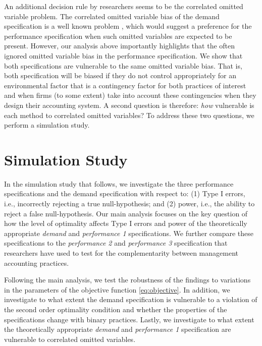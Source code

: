 \documentclass[12pt]{article}
\begin{document}
An additional decision rule by researchers seems to be the correlated omitted variable problem. The correlated omitted variable bias of the demand specification is a well known problem \citep{grabner_management_2013,arora_testing_1996,carree_note_2011}, which would suggest a preference for the performance specification when such omitted variables are expected to be present. However, our analysis above importantly highlights that the often ignored omitted variable bias in the performance specification. We show that both specifications are vulnerable to the same omitted variable bias. That is, both specification will be biased if they do not control appropriately for an environmental factor that is a contingency factor for both practices of interest and when firms (to some extent) take into account these contingencies when they design their accounting system. A second question is therefore: \emph{how} vulnerable is each method to correlated omitted variables? To address these two questions, we perform a simulation study.

\section{Simulation Study}\label{simulation-study}

In the simulation study that follows, we investigate the three performance specifications and the demand specification with respect to: (1) Type I errors, i.e., incorrectly rejecting a true null-hypothesis; and (2) power, i.e., the ability to reject a false null-hypothesis. Our main analysis focuses on the key question of how the level of optimality affects Type I errors and power of the theoretically appropriate \emph{demand} and \emph{performance 1} specifications. We further compare these specifications to the \emph{performance 2} and \emph{performance 3} specification that researchers have used to test for the complementarity between management accounting practices.  

Following the main analysis, we test the robustness of the findings to variations in the parameters of the objective function \eqref{eq:objective}. In addition, we investigate to what extent the demand specification is vulnerable to a violation of the second order optimality condition and whether the properties of the specifications change with binary practices. Lastly, we investigate to what extent the theoretically appropriate \emph{demand} and \emph{performance 1} specification are vulnerable to correlated omitted variables. 
\end{document}
